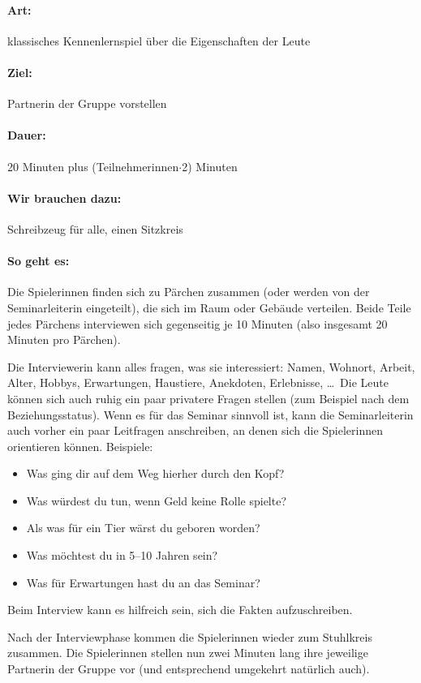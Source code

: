 \paragraph{Art:} klassisches Kennenlernspiel über die Eigenschaften der Leute
\paragraph{Ziel:} Partnerin der Gruppe vorstellen
\paragraph{Dauer:} 20 Minuten plus (Teilnehmerinnen$\cdot$2) Minuten
\paragraph{Wir brauchen dazu:} Schreibzeug für alle, einen Sitzkreis
\paragraph{So geht es:}
Die Spielerinnen finden sich zu Pärchen zusammen (oder werden von der Seminarleiterin eingeteilt), die sich im Raum oder Gebäude verteilen. Beide Teile jedes Pärchens interviewen sich gegenseitig je 10 Minuten (also insgesamt 20 Minuten pro Pärchen).

Die Interviewerin kann alles fragen, was sie interessiert: Namen, Wohnort, Arbeit, Alter, Hobbys, Erwartungen, Haustiere, Anekdoten, Erlebnisse, \ldots\ Die Leute können sich auch ruhig ein paar privatere Fragen stellen (zum Beispiel nach dem Beziehungsstatus). Wenn es für das Seminar sinnvoll ist, kann die Seminarleiterin auch vorher ein paar Leitfragen anschreiben, an denen sich die Spielerinnen orientieren können. Beispiele:
  \begin{itemize}
    \item Was ging dir auf dem Weg hierher durch den Kopf?
    \item Was würdest du tun, wenn Geld keine Rolle spielte?
    \item Als was für ein Tier wärst du geboren worden?
    \item Was möchtest du in 5--10 Jahren sein?
    \item Was für Erwartungen hast du an das Seminar?
  \end{itemize}

Beim Interview kann es hilfreich sein, sich die Fakten aufzuschreiben.

Nach der Interviewphase kommen die Spielerinnen wieder zum Stuhlkreis zusammen. Die Spielerinnen stellen nun zwei Minuten lang ihre jeweilige Partnerin der Gruppe vor (und entsprechend umgekehrt natürlich auch).

